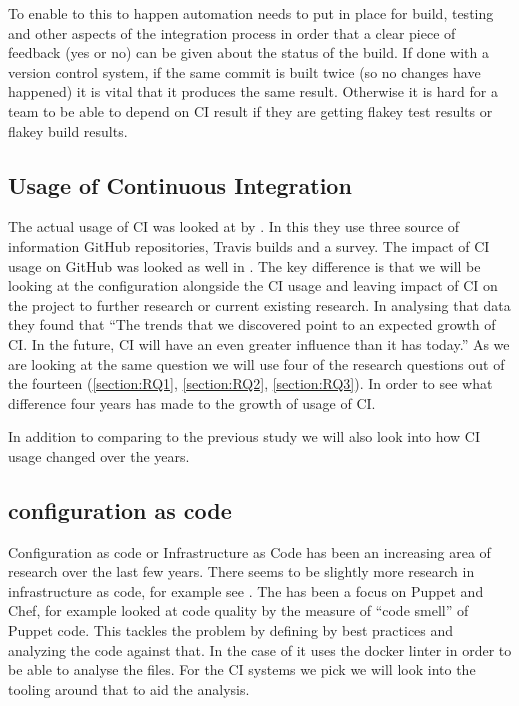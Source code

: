 \documentclass[10pt,conference]{IEEEtran}
\begin{document}
To enable to this to happen automation needs to put in place for build, testing and other aspects of the integration process in order that a clear piece of feedback (yes or no) can be given about the status of the build. If done with a version control system, if the same commit is built twice (so no changes have happened) it is vital that it produces the same result. Otherwise it is hard for a team to be able to depend on CI result if they are getting flakey test results or flakey build results.

\vspace*{-0.05in}
\subsection{Usage of Continuous Integration}
\vspace*{-0.05in}

The actual usage of CI was looked at by \cite{Hilton2016}. In this they use three source of information GitHub repositories, Travis builds and a survey. The impact of CI usage on GitHub was looked as well in \citet{Vasilescu2015}. The key difference is that we will be looking at the configuration alongside the CI usage and leaving impact of CI on the project to further research or current existing research. In analysing that data they found that \enquote{The trends that we discovered point to an expected growth of CI. In the future, CI will have an even greater influence than it has today.} As we are looking at the same question we will use four of the research questions out of the fourteen (\ref{section:RQ1}, \ref{section:RQ2}, \ref{section:RQ3}). In order to see what difference four years has made to the growth of usage of CI.

In addition to comparing to the previous study we will also look into how CI usage changed over the years. 

\vspace*{-0.05in}
\subsection{configuration as code}
\vspace*{-0.05in}

Configuration as code or Infrastructure as Code has been an increasing area of research over the last few years. There seems to be slightly more research in infrastructure as code, for example see \citet{Rahman2019}. The has been a focus on Puppet and Chef, for example \citet{Sharma2016} looked at code quality by the measure of \enquote{code smell} of Puppet code. This tackles the problem by defining by best practices and analyzing the code against that. In the case of \citet{Cito2017} it uses the docker linter in order to be able to analyse the files. 
For the CI systems we pick we will look into the tooling around that to aid the analysis.
\end{document}
